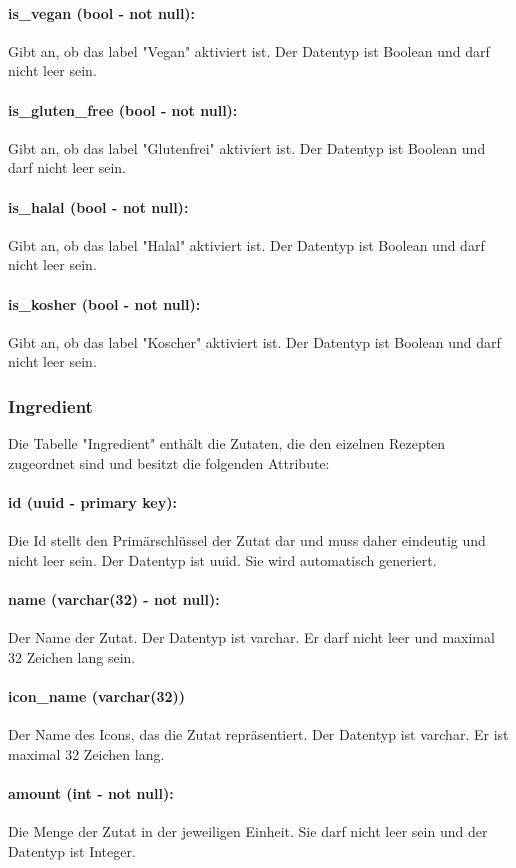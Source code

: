 \documentclass[parskip=full]{scrartcl}
\begin{document}
\paragraph{is\_vegan (bool - not null):} Gibt an, ob das \Gls{label} "Vegan" aktiviert ist. Der Datentyp ist Boolean und darf nicht leer sein.
\paragraph{is\_gluten\_free (bool - not null):} Gibt an, ob das \Gls{label} "Glutenfrei" aktiviert ist. Der Datentyp ist Boolean und darf nicht leer sein.
\paragraph{is\_halal (bool - not null):} Gibt an, ob das \Gls{label} "Halal" aktiviert ist. Der Datentyp ist Boolean und darf nicht leer sein.
\paragraph{is\_kosher (bool - not null):} Gibt an, ob das \Gls{label} "Koscher" aktiviert ist. Der Datentyp ist Boolean und darf nicht leer sein.
\newpage
\subsubsection{Ingredient}
Die Tabelle "Ingredient" enthält die Zutaten, die den eizelnen Rezepten zugeordnet sind und besitzt die folgenden Attribute:
\paragraph{id (uuid - primary key):} Die Id stellt den Primärschlüssel der Zutat dar und muss daher eindeutig und nicht leer sein. Der Datentyp ist \Gls{uuid}. Sie wird automatisch generiert.
\paragraph{name (varchar(32) - not null):} Der Name der Zutat. Der Datentyp ist \Gls{varchar}. Er darf nicht leer und maximal 32 Zeichen lang sein.
\paragraph{icon\_name (varchar(32))} Der Name des Icons, das die Zutat repräsentiert. Der Datentyp ist \Gls{varchar}. Er ist maximal 32 Zeichen lang.
\paragraph{amount (int - not null):} Die Menge der Zutat in der jeweiligen Einheit. Sie darf nicht leer sein und der Datentyp ist Integer.
\end{document}
